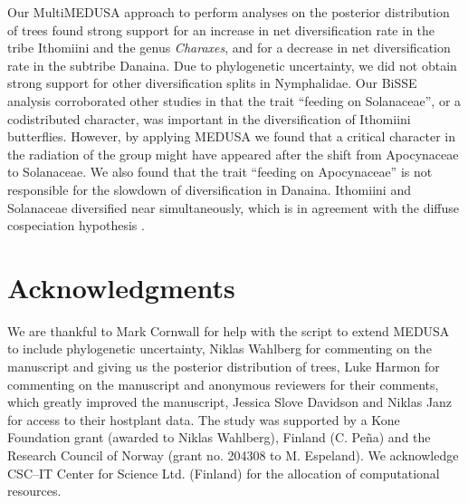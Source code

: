 \documentclass[10pt]{article}
\begin{document}
Our MultiMEDUSA approach to perform analyses on the posterior
distribution of trees found strong support for an increase in net
diversification rate in the tribe Ithomiini and the genus
\emph{Charaxes}, and for a decrease in net diversification rate in the
subtribe Danaina. Due to phylogenetic uncertainty, we did not obtain
strong support for other diversification splits in Nymphalidae. Our
BiSSE analysis corroborated other studies in that the trait 
``feeding on Solanaceae'', or a codistributed character, was important in the
diversification of Ithomiini butterflies. However, by applying MEDUSA we
found that a critical character in the radiation of the group might have
appeared after the shift from Apocynaceae to Solanaceae. We also found
that the trait ``feeding on Apocynaceae'' is not responsible for the
slowdown of diversification in Danaina. Ithomiini and Solanaceae
diversified near simultaneously, which is in agreement with the diffuse
cospeciation hypothesis \cite{nyman2012,janz2011}.

\section*{Acknowledgments}
We are thankful to Mark Cornwall for help with the script to extend
MEDUSA to include phylogenetic uncertainty, Niklas Wahlberg for
commenting on the manuscript and giving us the posterior distribution of
trees, Luke Harmon for commenting on the manuscript and anonymous
reviewers for their comments, which greatly improved the manuscript,
Jessica Slove Davidson and Niklas Janz for access to their hostplant
data. The study was supported by a Kone Foundation grant (awarded to
Niklas Wahlberg), Finland (C. Pe\~na) and the Research Council of Norway
(grant no. 204308 to M. Espeland). We acknowledge CSC--IT Center for
Science Ltd. (Finland) for the allocation of computational resources.
\end{document}
